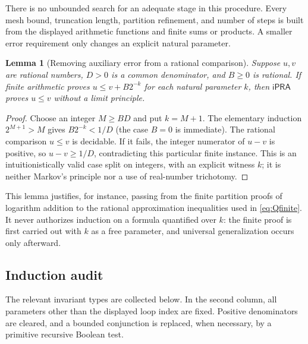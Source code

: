 \documentclass[11pt]{article}
\newtheorem{lemma}[theorem]{Lemma}
\theoremstyle{definition}
\newcommand{\ipra}{\mathsf{iPRA}}
\begin{document}
There is no unbounded search for an adequate stage in this procedure.
Every mesh bound, truncation length, partition refinement, and number of
steps is built from the displayed arithmetic functions and finite sums
or products. A smaller error requirement only changes an explicit natural
parameter.

\begin{lemma}[Removing auxiliary error from a rational comparison]
\label{lem:gap}
Suppose $u,v$ are rational numbers, $D>0$ is a common denominator,
and $B\ge0$ is rational. If finite arithmetic proves
$u\le v+B2^{-k}$ for each natural parameter $k$, then $\ipra$
proves $u\le v$ without a limit principle.
\end{lemma}

\begin{proof}
Choose an integer $M\ge BD$ and put $k=M+1$. The elementary
induction $2^{M+1}>M$ gives $B2^{-k}<1/D$ (the case $B=0$
is immediate). The rational comparison $u\le v$ is decidable. If
it fails, the integer numerator of $u-v$ is positive, so
$u-v\ge1/D$, contradicting this particular finite instance.
This is an intuitionistically valid case split on integers, with an
explicit witness $k$; it is neither Markov's principle nor a use of
real-number trichotomy.
\end{proof}

This lemma justifies, for instance, passing from the finite partition
proofs of logarithm addition to the rational approximation inequalities
used in \eqref{eq:Qfinite}. It never authorizes induction on a
formula quantified over $k$: the finite proof is first carried out with
$k$ as a free parameter, and universal generalization occurs only
afterward.

\subsection{Induction audit}

The relevant invariant types are collected below. In the second column,
all parameters other than the displayed loop index are fixed. Positive
denominators are cleared, and a bounded conjunction is replaced, when
necessary, by a primitive recursive Boolean test.
\end{document}
